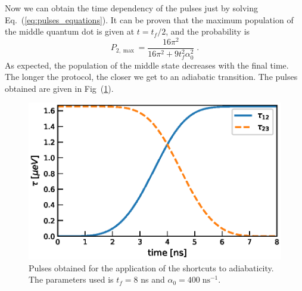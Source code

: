 \documentclass[a4paper,11pt]{article}
\begin{document}
Now we can obtain the time dependency of the pulses just by solving Eq.~(\ref{eq:pulses_equations}). It can be proven that the maximum population of the middle quantum dot is given at $t=t_f/2$, and the probability is
\begin{equation}
	P_{2,\max}=\frac{16\pi^2}{16\pi^2+9t_f^2\alpha_0^2}\; .
	\label{eq:P2_max}
\end{equation}
As expected, the population of the middle state decreases with the final time. The longer the protocol, the closer we get to an adiabatic transition. The pulses obtained are given in Fig~(\ref{fig:STA_TQD_Pulses}).
\begin{figure}[!htbp]
	\centering
	\includegraphics[width=0.7\linewidth]{STA_TQD_Pulses.eps}
	\caption{Pulses obtained for the application of the shortcuts to adiabaticity. The parameters used is $t_f=8$ ns and $\alpha_0=400\; \text{ns}^{-1}$.}
	\label{fig:STA_TQD_Pulses}
\end{figure}
\end{document}

